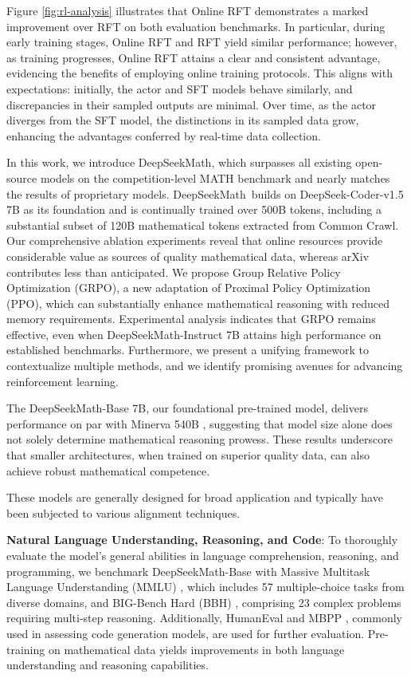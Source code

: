 Figure \ref{fig:rl-analysis} illustrates that Online RFT demonstrates a marked improvement over RFT on both evaluation benchmarks. In particular, during early training stages, Online RFT and RFT yield similar performance; however, as training progresses, Online RFT attains a clear and consistent advantage, evidencing the benefits of employing online training protocols. This aligns with expectations: initially, the actor and SFT models behave similarly, and discrepancies in their sampled outputs are minimal. Over time, as the actor diverges from the SFT model, the distinctions in its sampled data grow, enhancing the advantages conferred by real-time data collection.

In this work, we introduce DeepSeekMath, which surpasses all existing open-source models on the competition-level MATH benchmark and nearly matches the results of proprietary models. DeepSeekMath~builds on DeepSeek-Coder-v1.5 7B as its foundation and is continually trained over 500B tokens, including a substantial subset of 120B mathematical tokens extracted from Common Crawl. Our comprehensive ablation experiments reveal that online resources provide considerable value as sources of quality mathematical data, whereas arXiv contributes less than anticipated. We propose Group Relative Policy Optimization (GRPO), a new adaptation of Proximal Policy Optimization (PPO), which can substantially enhance mathematical reasoning with reduced memory requirements. Experimental analysis indicates that GRPO remains effective, even when DeepSeekMath-Instruct 7B attains high performance on established benchmarks. Furthermore, we present a unifying framework to contextualize multiple methods, and we identify promising avenues for advancing reinforcement learning.

    \item The DeepSeekMath-Base 7B, our foundational pre-trained model, delivers performance on par with Minerva 540B \citep{minerva}, suggesting that model size alone does not solely determine mathematical reasoning prowess. These results underscore that smaller architectures, when trained on superior quality data, can also achieve robust mathematical competence.

These models are generally designed for broad application and typically have been subjected to various alignment techniques.

\item \textbf{Natural Language Understanding, Reasoning, and Code}: To thoroughly evaluate the model’s general abilities in language comprehension, reasoning, and programming, we benchmark DeepSeekMath-Base with Massive Multitask Language Understanding (MMLU) \citep{mmlu}, which includes 57 multiple-choice tasks from diverse domains, and BIG-Bench Hard (BBH) \citep{bbh}, comprising 23 complex problems requiring multi-step reasoning. Additionally, HumanEval \citep{codex} and MBPP \citep{mbpp}, commonly used in assessing code generation models, are used for further evaluation. Pre-training on mathematical data yields improvements in both language understanding and reasoning capabilities.

